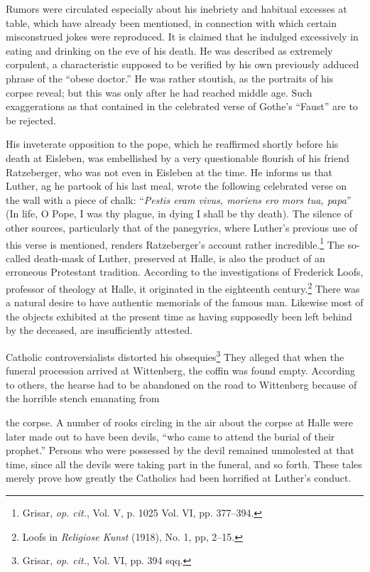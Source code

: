Rumors were circulated especially about his inebriety and habitual
excesses at table, which have already been mentioned, in connection
with which certain misconstrued jokes were reproduced. It is claimed
that he indulged excessively in eating and drinking on the eve of
his death. He was described as extremely corpulent, a characteristic
supposed to be verified by his own previously adduced phrase of
the “obese doctor.” He was rather stoutish, as the portraits of his
corpse reveal; but this was only after he had reached middle age.
Such exaggerations as that contained in the celebrated verse of
Gothe’s “Faust” are to be rejected.

His inveterate opposition to the pope, which he reaffirmed shortly
before his death at Eisleben, was embellished by a very questionable
flourish of his friend Ratzeberger, who was not even in Eisleben at
the time. He informs us that Luther, ag he partook of his last meal,
wrote the following celebrated verse on the wall with a piece of
chalk: “\textit{Pestis eram vivus, moriens ero mors tua, papa}” (In life, O
Pope, I was thy plague, in dying I shall be thy death). The silence of
other sources, particularly that of the panegyrics, where Luther’s
previous use of this verse is mentioned, renders Ratzeberger’s account
rather incredible.\footnote{Grisar, \textit{op. cit.}, Vol. V, p. 1025 Vol. VI, pp. 377--394.}
 The so-called death-mask of Luther, preserved
at Halle, is also the product of an erroneous Protestant tradition.
According to the investigations of Frederick Loofs, professor of theology
at Halle, it originated in the eighteenth century.\footnote{Loofs in \textit{Religiose Kunst} (1918), No. 1, pp, 2--15.}
 There was
a natural desire to have authentic memorials of the famous man.
Likewise most of the objects exhibited at the present time as having
supposedly been left behind by the deceased, are insufficiently attested.

Catholic controversialists distorted his obsequies\footnote{Grisar, \textit{op. cit.}, Vol. VI, pp. 394 sqq.}
 They alleged
that when the funeral procession arrived at Wittenberg, the coffin was
found empty. According to others, the hearse had to be abandoned on
the road to Wittenberg because of the horrible stench emanating from

the corpse. A number of rooks circling in the air about the corpse at
Halle were later made out to have been devils, “who came to attend
the burial of their prophet.” Persons who were possessed by the devil
remained unmolested at that time, since all the devils were taking part
in the funeral, and so forth. These tales merely prove how greatly the
Catholics had been horrified at Luther’s conduct.

